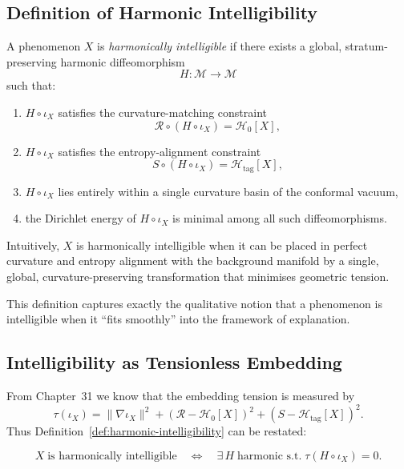 \subsection*{Definition of Harmonic Intelligibility}

\begin{definition}
\label{def:harmonic-intelligibility}
A phenomenon $X$ is \emph{harmonically intelligible} if there exists a global,
stratum-preserving harmonic diffeomorphism
\[
H : \mathcal{M} \longrightarrow \mathcal{M}
\]
such that:
\begin{enumerate}
\item $H \circ \iota_X$ satisfies the curvature-matching constraint
      \[
      \mathcal{R}\circ (H\circ\iota_X) = \mathcal{H}_0[X],
      \]
\item $H \circ \iota_X$ satisfies the entropy-alignment constraint
      \[
      S \circ (H\circ\iota_X) = \mathcal{H}_{\mathrm{tag}}[X],
      \]
\item $H\circ\iota_X$ lies entirely within a single curvature basin of the
      conformal vacuum,
\item the Dirichlet energy of $H\circ\iota_X$ is minimal among all such
      diffeomorphisms.
\end{enumerate}
\end{definition}

Intuitively, $X$ is harmonically intelligible when it can be placed in perfect
curvature and entropy alignment with the background manifold by a single,
global, curvature-preserving transformation that minimises geometric tension.

This definition captures exactly the qualitative notion that a phenomenon is
intelligible when it “fits smoothly” into the framework of explanation.

\subsection*{Intelligibility as Tensionless Embedding}

From Chapter~31 we know that the embedding tension is measured by
\[
\tau(\iota_X) 
  = \|\nabla\iota_X\|^2
    + (\mathcal{R}-\mathcal{H}_0[X])^2
    + (S-\mathcal{H}_{\mathrm{tag}}[X])^2.
\]
Thus Definition~\ref{def:harmonic-intelligibility} can be restated:

\begin{equation}
\label{eq:intelligibility-tensionless}
X\;\text{is harmonically intelligible}
\quad\Longleftrightarrow\quad
\exists\,H\;\text{harmonic s.t.}\;
\tau(H\circ\iota_X)=0.
\end{equation}

